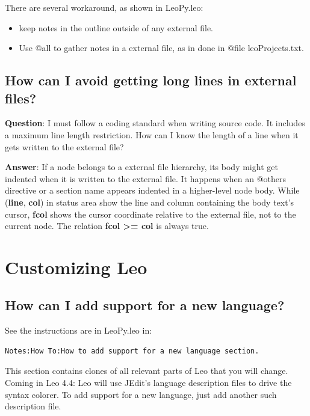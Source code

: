 \documentclass[a4paper,10pt,english]{sphinxmanual}
\begin{document}
There are several workaround, as shown in LeoPy.leo:
\begin{itemize}
\item {} 
keep notes in the outline outside of any external file.

\item {} 
Use @all to gather notes in a external file, as in done in @file leoProjects.txt.

\end{itemize}


\subsection{How can I avoid getting long lines in external files?}
\label{FAQ:how-can-i-avoid-getting-long-lines-in-external-files}
\textbf{Question}: I must follow a coding standard when writing source code. It
includes a maximum line length restriction. How can I know the length of a
line when it gets written to the external file?

\textbf{Answer}: If a node belongs to a external file hierarchy, its body might get
indented when it is written to the external file. It happens when an
@others directive or a section name appears indented in a higher-level
node body. While (\textbf{line}, \textbf{col}) in status area show the line and column
containing the body text's cursor, \textbf{fcol} shows the cursor coordinate
relative to the external file, not to the current node. The relation
\textbf{fcol \textgreater{}= col} is always true.


\section{Customizing Leo}
\label{FAQ:customizing-leo}

\subsection{How can I add support for a new language?}
\label{FAQ:how-can-i-add-support-for-a-new-language}
See the instructions are in LeoPy.leo in:

\begin{Verbatim}[commandchars=\\\{\}]
Notes:How To:How to add support for a new language section.
\end{Verbatim}

This section contains clones of all relevant parts of Leo that you will change.
Coming in Leo 4.4: Leo will use JEdit's language description files to drive the
syntax colorer. To add support for a new language, just add another such
description file.
\end{document}
